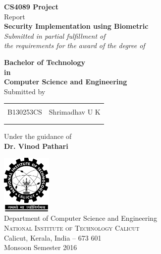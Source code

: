 \begin{titlepage}

\begin{center}

\textup{\small {\bf CS4089 Project} \\ Report}\\[0.2in]

\Large \textbf {Security Implementation using Biometric}\\[0.5in]

       \small \emph{Submitted in partial fulfillment of\\
        the requirements for the award of the degree of}
        \vspace{.2in}

       {\bf Bachelor of Technology \\in\\ Computer Science and Engineering}\\[0.5in]

\normalsize Submitted by \\
\begin{table}[h]
\centering
\begin{tabular}{lr}\hline \\
B130253CS & Shrimadhav U K \\ \\ \hline
\\
\end{tabular}
\end{table}

\vspace{.1in}
Under the guidance of\\
{\textbf{Dr. Vinod Pathari}}\\[0.2in]

\vfill

\includegraphics[width=0.18\textwidth]{./nitc-logo}\\[0.1in]
\Large{Department of Computer Science and Engineering}\\
\normalsize
\textsc{National Institute of Technology Calicut}\\
Calicut, Kerala, India -- 673 601 \\
\vspace{0.2cm}
Monsoon Semester 2016

\end{center}

\end{titlepage}
